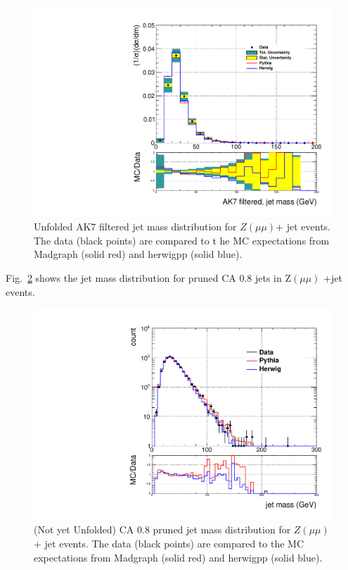 \begin{figure}[!htb]
\centering\includegraphics[width=1.\textwidth]{figs/Zmm/jetmassunf_ak7ft_allpT.pdf}
\caption{Unfolded AK7 filtered jet mass distribution for $Z(\mu\mu)$+ jet events. The data (black points) are compared to t
he MC expectations from Madgraph (solid red) and herwigpp (solid blue).}
\label{figs:AK7ZmmInt4}
\end{figure}


Fig.~\ref{figs:prunedZmmInt1} shows the jet mass distribution for pruned CA 0.8 jets in Z$(\mu\mu)$ +jet events.
 
\begin{figure}[!htb]
\centering
\includegraphics[width=1.\textwidth]{figs/Zmm/jetmassReco_ca8_allpT.pdf}
\caption{(Not yet Unfolded) CA 0.8 pruned jet mass distribution for $Z(\mu\mu)$+ jet events. The data (black points) are compared to the MC expectations from Madgraph (solid red) and herwigpp (solid blue).}
\label{figs:prunedZmmInt1}
\end{figure}


